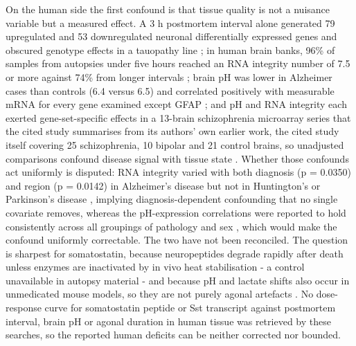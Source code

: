 \documentclass[11pt]{article}
\begin{document}
On the human side the first confound is that tissue quality is not a nuisance variable but a measured effect. A 3 h postmortem interval alone generated 79 upregulated and 53 downregulated neuronal differentially expressed genes and obscured genotype effects in a tauopathy line \citep{Olney2025}; in human brain banks, 96\% of samples from autopsies under five hours reached an RNA integrity number of 7.5 or more against 74\% from longer intervals \citep{Birdsill2010}; brain pH was lower in Alzheimer cases than controls (6.4 versus 6.5) and correlated positively with measurable mRNA for every gene examined except GFAP \citep{Preece2003}; and pH and RNA integrity each exerted gene-set-specific effects in a 13-brain schizophrenia microarray series that the cited study summarises from its authors' own earlier work, the cited study itself covering 25 schizophrenia, 10 bipolar and 21 control brains, so unadjusted comparisons confound disease signal with tissue state \citep{Hatano2025}. Whether those confounds act uniformly is disputed: RNA integrity varied with both diagnosis (p = 0.0350) and region (p = 0.0142) in Alzheimer's disease but not in Huntington's or Parkinson's disease \citep{Highet2021}, implying diagnosis-dependent confounding that no single covariate removes, whereas the pH-expression correlations were reported to hold consistently across all groupings of pathology and sex \citep{Preece2003}, which would make the confound uniformly correctable. The two have not been reconciled. The question is sharpest for somatostatin, because neuropeptides degrade rapidly after death unless enzymes are inactivated by in vivo heat stabilisation \citep{Salviati2025} - a control unavailable in autopsy material - and because pH and lactate shifts also occur in unmedicated mouse models, so they are not purely agonal artefacts \citep{Hagihara2017}. No dose-response curve for somatostatin peptide or Sst transcript against postmortem interval, brain pH or agonal duration in human tissue was retrieved by these searches, so the reported human deficits can be neither corrected nor bounded.
\end{document}
